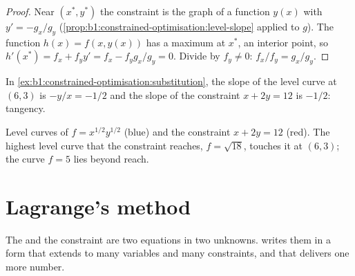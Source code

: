 \begin{proof}
Near $(x^*, y^*)$ the constraint is the graph of a function $y(x)$ with
$y' = -g_x/g_y$ (\cref{prop:b1:constrained-optimisation:level-slope} applied
to $g$). The function $h(x) = f(x, y(x))$ has a maximum at $x^*$, an interior
point, so $h'(x^*) = f_x + f_y y' = f_x - f_y g_x/g_y = 0$. Divide by
$f_y \neq 0$: $f_x/f_y = g_x/g_y$.
\end{proof}

In \cref{ex:b1:constrained-optimisation:substitution}, the slope of the
level curve at $(6, 3)$ is $-y/x = -1/2$ and the slope of the constraint
$x + 2y = 12$ is $-1/2$: tangency.

\begin{omfigure}

{\small Level curves of $f = x^{1/2}y^{1/2}$ (blue) and the constraint
$x + 2y = 12$ (red). The highest level curve that the constraint reaches,
$f = \sqrt{18}$, touches it at $(6, 3)$; the curve $f = 5$ lies beyond reach.}
\end{omfigure}

\section{Lagrange's method}\label{sec:b1:constrained-optimisation:lagrange}

The  and the constraint are two equations in two
unknowns.  writes them in a form that extends to many
variables and many constraints, and that delivers one more number.

